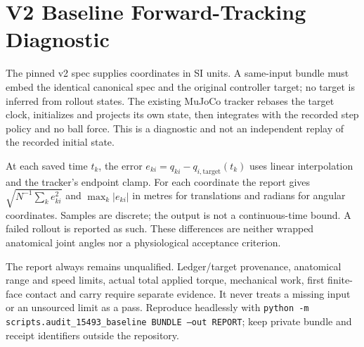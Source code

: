\documentclass{article}
\begin{document}
\section{V2 Baseline Forward-Tracking Diagnostic}
The pinned v2 spec supplies coordinates in SI units. A same-input bundle must
embed the identical canonical spec and the original controller target; no
target is inferred from rollout states. The existing MuJoCo tracker rebases
the target clock, initializes and projects its own state, then integrates with
the recorded step policy and no ball force. This is a diagnostic and not an
independent replay of the recorded initial state.

At each saved time $t_k$, the error $e_{ki}=q_{ki}-q_{i,\mathrm{target}}(t_k)$
uses linear interpolation and the tracker's endpoint clamp. For each coordinate
the report gives $\sqrt{N^{-1}\sum_k e_{ki}^2}$ and $\max_k |e_{ki}|$ in metres
for translations and radians for angular coordinates. Samples are discrete;
the output is not a continuous-time bound. A failed rollout is reported as
such. These differences are neither wrapped anatomical joint angles nor a
physiological acceptance criterion.

The report always remains unqualified. Ledger/target provenance, anatomical
range and speed limits, actual total applied torque, mechanical work, first
finite-face contact and carry require separate evidence. It never treats a
missing input or an unsourced limit as a pass. Reproduce headlessly with
\texttt{python -m scripts.audit\_15493\_baseline BUNDLE --out REPORT}; keep
private bundle and receipt identifiers outside the repository.
\end{document}
